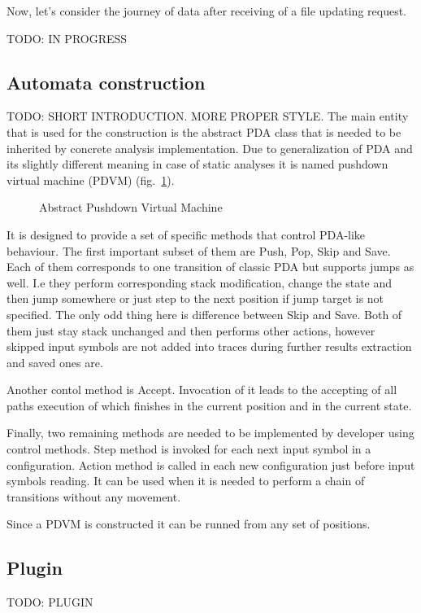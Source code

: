 Now, let's consider the journey of data after receiving of a file updating request.

TODO: IN PROGRESS

\subsection{Automata construction}

TODO: SHORT INTRODUCTION. MORE PROPER STYLE.
The main entity that is used for the construction is the abstract PDA class that is needed to be inherited by concrete analysis implementation.
Due to generalization of PDA and its slightly different meaning in case of static analyses it is named pushdown virtual machine (PDVM) (fig.~\ref{fig:PDVM}).

\begin{figure}[h]
	\caption{Abstract Pushdown Virtual Machine}
	\label{fig:PDVM}
\end{figure}

It is designed to provide a set of specific methods that control PDA-like behaviour.
The first important subset of them are Push, Pop, Skip and Save.
Each of them corresponds to one transition of classic PDA but supports jumps as well.
I.e they perform corresponding stack modification, change the state and then jump somewhere or just step to the next position if jump target is not specified.
The only odd thing here is difference between Skip and Save.
Both of them just stay stack unchanged and then performs other actions, however skipped input symbols are not added into traces during further results extraction and saved ones are.

Another contol method is Accept.
Invocation of it leads to the accepting of all paths execution of which finishes in the current position and in the current state.

Finally, two remaining methods are needed to be implemented by developer using control methods.
Step method is invoked for each next input symbol in a configuration.
Action method is called in each new configuration just before input symbols reading.
It can be used when it is needed to perform a chain of transitions without any movement.

Since a PDVM is constructed it can be runned from any set of positions.

\subsection{Plugin}

TODO: PLUGIN
